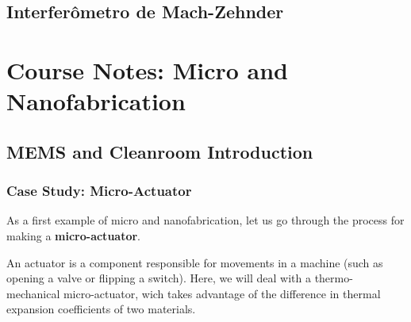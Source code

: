 \documentclass[12pt,a4paper]{report}
\begin{document}
\pagebreak

\section{Interferômetro de Mach-Zehnder}\label{mach.zender.section}






\pagebreak











\chapter{Course Notes: Micro and Nanofabrication}

\section{MEMS and Cleanroom Introduction}

\subsection{Case Study: Micro-Actuator}

As a first example of micro and nanofabrication, let us go through the process for making a \textbf{micro-actuator}.

An actuator is a component responsible for movements in a machine (such as opening a valve or flipping a switch). Here, we will deal with a thermo-mechanical micro-actuator, wich takes advantage of the difference in thermal expansion coefficients of two materials.
\end{document}
